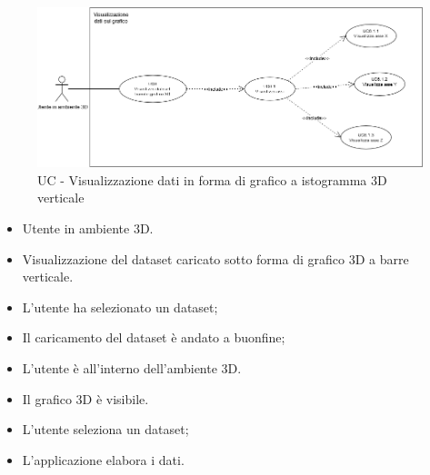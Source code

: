 \begin{figure}[h!]
    \centering
    \includegraphics[scale=0.7]{template/images/UC6.png}
    \caption{UC - Visualizzazione dati in forma di grafico a istogramma 3D verticale}
\end{figure}
\UCdsc
    { %
        \begin{itemize}
            \item Utente in ambiente 3D.
        \end{itemize}
    }
    { %
        \begin{itemize}
            \item Visualizzazione del dataset caricato sotto forma di grafico 3D a barre verticale.
        \end{itemize}
    }
    { %
        \begin{itemize}
            \item L'utente ha selezionato un dataset;
            \item Il caricamento del dataset è andato a buonfine;
            \item L'utente è all'interno dell'ambiente 3D.
        \end{itemize}
    }
    { %
        \begin{itemize}
            \item Il grafico 3D è visibile.
        \end{itemize}
    }
    { %
        \begin{itemize}
            \item L'utente seleziona un dataset;
            \item L'applicazione elabora i dati.
        \end{itemize}
    }




